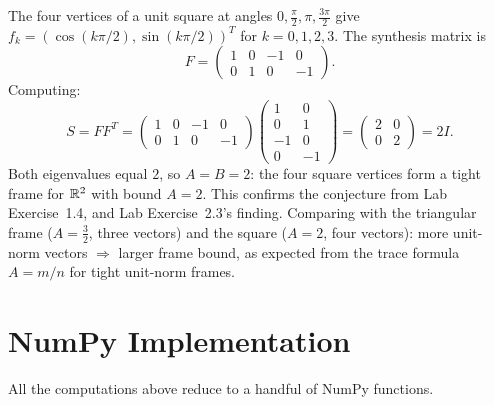 \begin{examplebox}[title={Example 3.6: Square vertices in $\R^2$}]
\label{ex:frame-op-square}
The four vertices of a unit square at angles
$0,\tfrac\pi2,\pi,\tfrac{3\pi}{2}$ give
$f_k=(\cos(k\pi/2),\sin(k\pi/2))^T$ for $k=0,1,2,3$. The synthesis
matrix is
\[
  F = \begin{pmatrix}1&0&-1&0\\0&1&0&-1\end{pmatrix}.
\]
Computing:
\[
  S = FF^T = \begin{pmatrix}1&0&-1&0\\0&1&0&-1\end{pmatrix}
  \begin{pmatrix}1&0\\0&1\\-1&0\\0&-1\end{pmatrix}
  = \begin{pmatrix}2&0\\0&2\end{pmatrix} = 2I.
\]
Both eigenvalues equal $2$, so $A=B=2$: the four square vertices form a
tight frame for $\R^2$ with bound $A=2$. This confirms the conjecture
from Lab Exercise~1.4, and Lab Exercise~2.3's finding. Comparing with the
triangular frame ($A=\tfrac32$, three vectors) and the square ($A=2$,
four vectors): more unit-norm vectors $\Rightarrow$ larger frame bound, as
expected from the trace formula $A=m/n$ for tight unit-norm frames.
\end{examplebox}

\section{NumPy Implementation}
\label{sec:numpy-implementation}

All the computations above reduce to a handful of NumPy functions.

